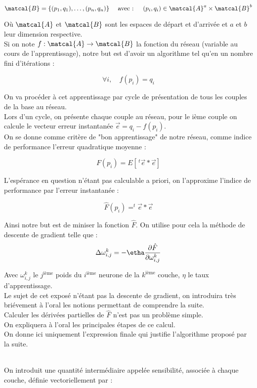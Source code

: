 \documentclass[a4paper, 11pt]{article}
\begin{document}
$$\matcal{B} = \{(p_1,q_1), \dots, (p_n, q_n)\} \quad \text{ avec : } \quad (p_i,q_i) \in \matcal{A}^a \times \matcal{B}^b$$

Où $\matcal{A}$ et $\matcal{B}$ sont les espaces de départ et d'arrivée et $a$ et $b$ leur dimension respective.\\
Si on note $f:\matcal{A}\to \matcal{B}$ la fonction du réseau (variable au cours de l'apprentissage), notre but est d'avoir un algorithme tel qu'en un nombre fini d'itérations :

$$ \forall i, \quad f(p_i) = q_i $$

On va procéder à cet apprentissage par cycle de présentation de tous les couples de la base au réseau.\\
Lors d'un cycle, on présente chaque couple au réseau, pour le ième couple on calcule le vecteur erreur instantanée $\vec{e} = q_i-f(p_i)$.\\
On se donne comme critère de "bon apprentissage" de notre réseau, comme indice de performance l'erreur quadratique moyenne :

$$ F(p_i)  = E[\,^t  \vec{e} * \vec{e}]$$

L'espérance en question n'étant pas calculable a priori, on l'approxime l'indice de performance par l'erreur instantanée :

$$  \hat{F}(p_i) = ^t \vec{e}*\vec{e}$$

Ainsi notre but est de miniser la fonction $ \hat{F} $.
On utilise pour cela la méthode de descente de gradient telle que : \\

$$ 
	\Delta \omega^{k}_{i,j} = -\etha \frac{\partial \hat{F}}{\partial \omega^{k}_{i,j}}
$$

Avec $ \omega^{k}_{i,j}$ le $j^{\text{ième}}$ poids du $i^{\text{ième}}$ neurone de la $k^{\text{ième}}$ couche, $\eta$ le taux d'apprentissage.\\
Le sujet de cet exposé n'étant pas la descente de gradient, on introduira très briévement à l'oral les notions permettant de comprendre la suite.\\
Calculer les dérivées partielles de $\hat{F}$ n'est pas un problème simple.
\\ On expliquera à l'oral les principales étapes de ce calcul.
\\ On donne ici uniquement l'expression finale qui justifie l'algorithme proposé par la suite.

\\ On introduit une quantité intermédiaire appelée sensibilité, associée à chaque couche, définie vectoriellement par : 
\end{document}
